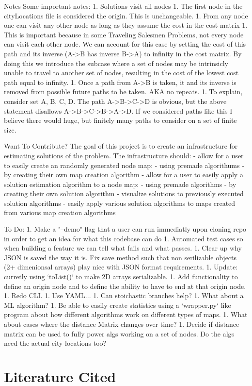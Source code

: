 \documentclass[12pt]{article}
\begin{document}
Notes
Some important notes:
1.  Solutions visit all nodes
1.  The first node in the cityLocations file is considered the origin.  This is unchangeable.
1.  From any node one can visit any other node as long as they assume the cost in the cost matrix
    1.  This is important because in some Traveling Salesmen Problems, not every node can visit each other node.  We can account for this case by setting the cost of this path and its inverse (A->B has inverse B->A) to infinity in the cost matrix.  By doing this we introduce the subcase where a set of nodes may be intrinsicly unable to travel to another set of nodes, resulting in the cost of the lowest cost path equal to infinity.
1.  Once a path from A->B is taken, it and its inverse is removed from possible future paths to be taken.  AKA no repeats.
    1.  To explain, consider set {A, B, C, D}.  The path A->B->C->D is obvious, but the above statement disallows A->B->C->B->A->D.  If we considered paths like this I believe there would huge, but finitely many paths to consider on a set of finite size.  


Want To Contribute?
The goal of this project is to create an infrastructure for estimating solutions of the problem.  The infrastructure should:
- allow for a user to easily create an randomly generated node map:
    - using premade algorithums
    - by creating their own map creation algorithm
- allow for a user to easily apply a solution estimation algorithm to a node map:
    - using premade algorithms
    - by creating their own solution algorithm
- visualize solutions to previously executed solution algorithms
- easily apply various solution algorithms to maps created from various map creation algorithms
  
  
To Do:
1.  Make a "--demo" flag that a user can run immediatly upon cloning repo in order to get an idea for what this codebase can do
1.  Automated test cases so when building a feature we can tell what fails and what passes.
1.  Clear up why JSON is saved the way it is.  Fix save method such that non serilizable objects (2+ dimenionsal arrays) play nice with JSON format requirements.
    1.  Update: curretly using `toList()` to make 2D arrays serializable.
1.  Add functionality to define an origin node and to define the ability to have to end at that origin node.
1.  Redo CLI.
1.  Use YAML...
1.  Can stoichastic branches help?
1.  What about a ML algorithm?
1.  Be able to easily create statistics using a `wrapper.py` like program about how different algorithms work on different types of maps.
1.  What about cases where the distance Matrix changes over time?
1.  Decide if distance matrix can be used to fully power algs working on a set of nodes.  Do the algs need the actual city locations too?



\section*{Literature Cited}
\end{document}
